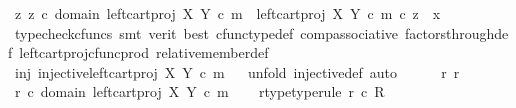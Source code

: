 \begin{isabellebody}
\ {\isachardoublequoteopen}{\isasymexists}z{\isachardot}{\kern0pt}\ z\ {\isasymin}\isactrlsub c\ domain\ {\isacharparenleft}{\kern0pt}left{\isacharunderscore}{\kern0pt}cart{\isacharunderscore}{\kern0pt}proj\ X\ Y\ {\isasymcirc}\isactrlsub c\ m{\isacharparenright}{\kern0pt}\ {\isasymand}\ {\isacharparenleft}{\kern0pt}left{\isacharunderscore}{\kern0pt}cart{\isacharunderscore}{\kern0pt}proj\ X\ Y\ {\isasymcirc}\isactrlsub c\ m{\isacharparenright}{\kern0pt}\ {\isasymcirc}\isactrlsub c\ z\ {\isacharequal}{\kern0pt}\ x{\isachardoublequoteclose}\isanewline
\ \ \ \ \ \ \isamarkupfalse%
\ {\isacharparenleft}{\kern0pt}typecheck{\isacharunderscore}{\kern0pt}cfuncs{\isacharcomma}{\kern0pt}\ smt\ {\isacharparenleft}{\kern0pt}verit{\isacharcomma}{\kern0pt}\ best{\isacharparenright}{\kern0pt}\ cfunc{\isacharunderscore}{\kern0pt}type{\isacharunderscore}{\kern0pt}def\ comp{\isacharunderscore}{\kern0pt}associative\ factors{\isacharunderscore}{\kern0pt}through{\isacharunderscore}{\kern0pt}def{}\ left{\isacharunderscore}{\kern0pt}cart{\isacharunderscore}{\kern0pt}proj{\isacharunderscore}{\kern0pt}cfunc{\isacharunderscore}{\kern0pt}prod\ relative{\isacharunderscore}{\kern0pt}member{\isacharunderscore}{\kern0pt}def{}{\isacharparenright}{\kern0pt}\isanewline
\ \ \isamarkupfalse%
\isanewline
\ \ \isamarkupfalse%
\ inj{\isacharcolon}{\kern0pt}\ {\isachardoublequoteopen}injective{\isacharparenleft}{\kern0pt}left{\isacharunderscore}{\kern0pt}cart{\isacharunderscore}{\kern0pt}proj\ X\ Y\ {\isasymcirc}\isactrlsub c\ m{\isacharparenright}{\kern0pt}{\isachardoublequoteclose}\isanewline
\ \ \isamarkupfalse%
{\isacharparenleft}{\kern0pt}unfold\ injective{\isacharunderscore}{\kern0pt}def{\isacharcomma}{\kern0pt}\ auto{\isacharparenright}{\kern0pt}\isanewline
\ \ \ \ \isamarkupfalse%
\ r{}\ r{}\ \isanewline
\ \ \ \ \isamarkupfalse%
\ {\isachardoublequoteopen}r{}\ {\isasymin}\isactrlsub c\ domain\ {\isacharparenleft}{\kern0pt}left{\isacharunderscore}{\kern0pt}cart{\isacharunderscore}{\kern0pt}proj\ X\ Y\ {\isasymcirc}\isactrlsub c\ m{\isacharparenright}{\kern0pt}{\isachardoublequoteclose}\ \isamarkupfalse%
\ \isamarkupfalse%
\ r{}{\isacharunderscore}{\kern0pt}type{\isacharbrackleft}{\kern0pt}type{\isacharunderscore}{\kern0pt}rule{\isacharbrackright}{\kern0pt}{\isacharcolon}{\kern0pt}\ {\isachardoublequoteopen}r{}\ {\isasymin}\isactrlsub c\ R{\isachardoublequoteclose}\isanewline

\end{isabellebody}

